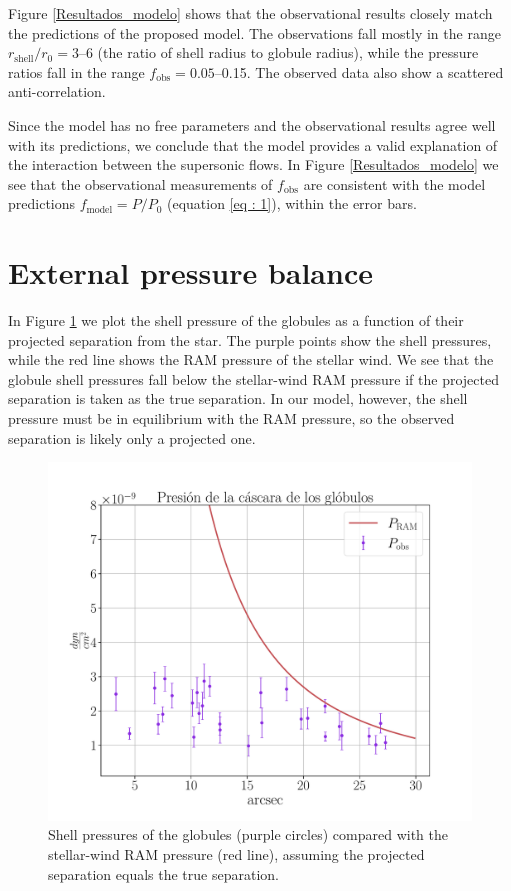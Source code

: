 \documentclass{book}
\begin{document}
Figure \ref{Resultados_modelo} shows that the observational results
closely match the predictions of the proposed model. The observations
fall mostly in the range $r_\mathrm{shell}/r_0=3$--6 (the ratio of
shell radius to globule radius), while the pressure ratios fall in the
range $f_\mathrm{obs}=0.05$--0.15. The observed data also show a
scattered anti-correlation.

Since the model has no free parameters and the observational results
agree well with its predictions, we conclude that the model provides a
valid explanation of the interaction between the supersonic flows. In
Figure \ref{Resultados_modelo} we see that the observational
measurements of $f_\mathrm{obs}$ are consistent with the model
predictions $f_\mathrm{model}=P/P_0$ (equation \ref{eq : 1}), within
the error bars.

\section{External pressure balance}\label{Sec:proyeccion}

In Figure \ref{graf_presion} we plot the shell pressure of the globules
as a function of their projected separation from the star. The purple
points show the shell pressures, while the red line shows the RAM
pressure of the stellar wind. We see that the globule shell pressures
fall below the stellar-wind RAM pressure if the projected separation
is taken as the true separation. In our model, however, the shell
pressure must be in equilibrium with the RAM pressure, so the observed
separation is likely only a projected one.

\begin{figure}[htb]
    \centering
    \includegraphics[width=\textwidth]{imagenes_corregidas/S_R.pdf}
    \caption{Shell pressures of the globules (purple circles) compared
      with the stellar-wind RAM pressure (red line), assuming the
      projected separation equals the true separation.}
    \label{graf_presion}
\end{figure}
\end{document}
